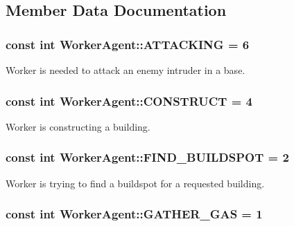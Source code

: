 \subsection{Member Data Documentation}
\hypertarget{class_worker_agent_a05f75e7ef9ba5d26a338ae4efa3cd90a}{
\subsubsection[{A\-T\-T\-A\-C\-K\-I\-N\-G}]{\setlength{\rightskip}{0pt plus 5cm}const int Worker\-Agent\-::\-A\-T\-T\-A\-C\-K\-I\-N\-G = 6\hspace{0.3cm}{\ttfamily [static]}}}\label{class_worker_agent_a05f75e7ef9ba5d26a338ae4efa3cd90a}
Worker is needed to attack an enemy intruder in a base. \hypertarget{class_worker_agent_aa6ff635d2c6d5e87c771388b64ae1d4c}{
\subsubsection[{C\-O\-N\-S\-T\-R\-U\-C\-T}]{\setlength{\rightskip}{0pt plus 5cm}const int Worker\-Agent\-::\-C\-O\-N\-S\-T\-R\-U\-C\-T = 4\hspace{0.3cm}{\ttfamily [static]}}}\label{class_worker_agent_aa6ff635d2c6d5e87c771388b64ae1d4c}
Worker is constructing a building. \hypertarget{class_worker_agent_ae82c1bb4ab0a800baf1ad64700dce8fc}{
\subsubsection[{F\-I\-N\-D\-\_\-\-B\-U\-I\-L\-D\-S\-P\-O\-T}]{\setlength{\rightskip}{0pt plus 5cm}const int Worker\-Agent\-::\-F\-I\-N\-D\-\_\-\-B\-U\-I\-L\-D\-S\-P\-O\-T = 2\hspace{0.3cm}{\ttfamily [static]}}}\label{class_worker_agent_ae82c1bb4ab0a800baf1ad64700dce8fc}
Worker is trying to find a buildspot for a requested building. \hypertarget{class_worker_agent_a587e98fd64ab6a77970afa3cc154ee1a}{
\subsubsection[{G\-A\-T\-H\-E\-R\-\_\-\-G\-A\-S}]{\setlength{\rightskip}{0pt plus 5cm}const int Worker\-Agent\-::\-G\-A\-T\-H\-E\-R\-\_\-\-G\-A\-S = 1\hspace{0.3cm}{\ttfamily [static]}}}\label{class_worker_agent_a587e98fd64ab6a77970afa3cc154ee1a}
